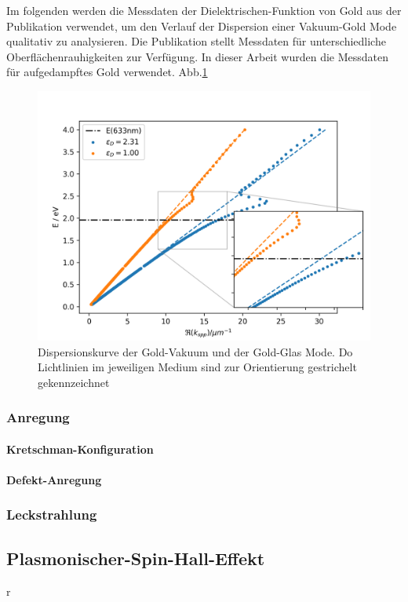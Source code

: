 \documentclass{article}
\begin{document}
	Im folgenden werden die Messdaten der Dielektrischen-Funktion von Gold aus der Publikation \cite{Olmon.2012} verwendet, um den Verlauf der Dispersion einer Vakuum-Gold Mode qualitativ zu analysieren.  Die Publikation stellt Messdaten für unterschiedliche Oberflächenrauhigkeiten zur Verfügung. In dieser Arbeit wurden die Messdaten für aufgedampftes Gold verwendet. Abb.\ref{fig:dispersion_spp}
	
	\begin{figure}[htbp]
		\label{fig:dispersion_spp}
		\centering
		\includegraphics[width=1\textwidth]{figures/dispersion.png}
		\caption{Dispersionskurve der Gold-Vakuum und der Gold-Glas Mode. Do Lichtlinien im jeweiligen Medium sind zur Orientierung gestrichelt gekennzeichnet}		
	\end{figure}
	
		\subsubsection{Anregung}
			\paragraph{Kretschman-Konfiguration}
			\paragraph{Defekt-Anregung}
		\subsubsection{Leckstrahlung}
	\subsection{Plasmonischer-Spin-Hall-Effekt}r
\end{document}
